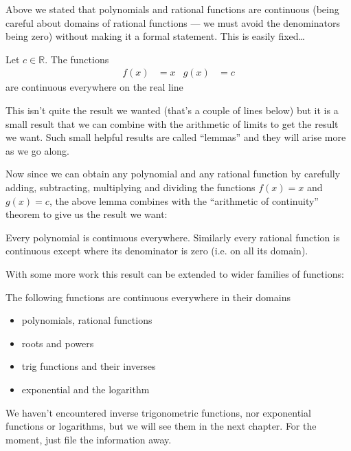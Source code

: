 Above we stated that polynomials and rational functions are
continuous (being careful about domains of rational functions ---
we must avoid the denominators being zero) without making it a formal
statement. This is easily fixed\dots

\begin{lemma}\label{lem_1_6_1}
 Let $c \in \mathbb{R}$. The functions
  \begin{align*}
  f(x) &= x & g(x) &= c
  \end{align*}
  are continuous everywhere on the real line
\end{lemma}
This isn't quite the result we wanted (that's a couple of lines below) but it
is a small result that we can combine with the arithmetic of limits to get the
result we want. Such small helpful results are called ``lemmas'' and they will
arise more as we go along.

Now since we can obtain any polynomial and any rational function by carefully
adding, subtracting, multiplying and dividing the functions $f(x)=x$ and
$g(x)=c$, the above lemma combines with the ``arithmetic of continuity''
theorem to give us the result we want:
%
\begin{theorem}
\label{thm_1_6_1}
Every polynomial is continuous everywhere. Similarly every rational
function is continuous except where its denominator is zero (i.e. on all its
domain).
\end{theorem}

With some more work this result can be extended to wider families of functions:
\begin{theorem}\label{thm_1_6_2}
The following functions are continuous everywhere in their domains
\begin{itemize}
\item polynomials, rational functions
\item roots and powers
\item trig functions and their inverses
\item exponential and the logarithm
\end{itemize}
\end{theorem}
We haven't encountered inverse trigonometric functions, nor exponential
functions or logarithms, but we will see them in the next chapter. For the
moment, just file the information away.


